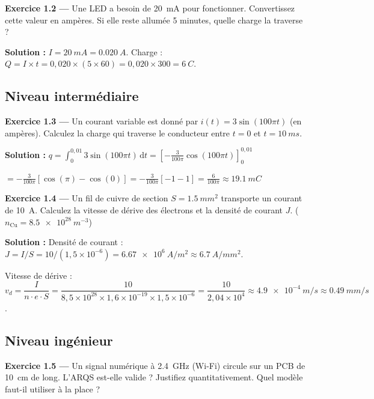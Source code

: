 \documentclass[12pt,a4paper,twoside]{book}
\begin{document}
\textbf{Exercice 1.2 —} Une LED a besoin de \SI{20}{mA} pour fonctionner. Convertissez cette valeur en ampères. Si elle reste allumée 5 minutes, quelle charge la traverse ?

\begin{pratique}
\textbf{Solution :} $I = \SI{20}{mA} = \SI{0.020}{A}$.
Charge : $Q = I \times t = 0{,}020 \times (5 \times 60) = 0{,}020 \times 300 = \SI{6}{C}$.
\end{pratique}

\subsection*{Niveau intermédiaire}

\textbf{Exercice 1.3 —} Un courant variable est donné par $i(t) = 3\sin(100\pi t)$ (en ampères). Calculez la charge qui traverse le conducteur entre $t = 0$ et $t = \SI{10}{ms}$.

\begin{pratique}
\textbf{Solution :} $q = \int_0^{0{,}01} 3\sin(100\pi t)\,\mathrm{d}t = \left[-\frac{3}{100\pi}\cos(100\pi t)\right]_0^{0{,}01}$

$= -\frac{3}{100\pi}[\cos(\pi) - \cos(0)] = -\frac{3}{100\pi}[-1-1] = \frac{6}{100\pi} \approx \SI{19.1}{mC}$
\end{pratique}

\textbf{Exercice 1.4 —} Un fil de cuivre de section $S = \SI{1.5}{mm^2}$ transporte un courant de \SI{10}{A}. Calculez la vitesse de dérive des électrons et la densité de courant $J$. ($n_{\text{Cu}} = \SI{8.5e28}{m^{-3}}$)

\begin{pratique}
\textbf{Solution :}
Densité de courant : $J = I/S = 10 / (1{,}5 \times 10^{-6}) = \SI{6.67e6}{A/m^2} \approx \SI{6.7}{A/mm^2}$.

Vitesse de dérive : $v_d = \dfrac{I}{n \cdot e \cdot S} = \dfrac{10}{8{,}5\times10^{28} \times 1{,}6\times10^{-19} \times 1{,}5\times10^{-6}} = \dfrac{10}{2{,}04\times10^{4}} \approx \SI{4.9e-4}{m/s} \approx \SI{0.49}{mm/s}$.
\end{pratique}

\subsection*{Niveau ingénieur}

\textbf{Exercice 1.5 —} Un signal numérique à \SI{2.4}{GHz} (Wi-Fi) circule sur un PCB de \SI{10}{cm} de long. L'ARQS est-elle valide ? Justifiez quantitativement. Quel modèle faut-il utiliser à la place ?
\end{document}
